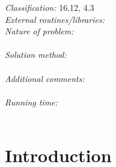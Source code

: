 \documentclass[preprint,12pt]{elsarticle}
\begin{document}
\begin{small}
{\em Classification:} 16.12, 4.3                                \\
{\em External routines/libraries:}                            \\
{\em Nature of problem:}\\
   \\
{\em Solution method:}\\
   \\
{\em Additional comments:}\\
   \\
{\em Running time:}\\
   \\

\end{small}


\section{Introduction}
\label{sec:intro}
\end{document}
